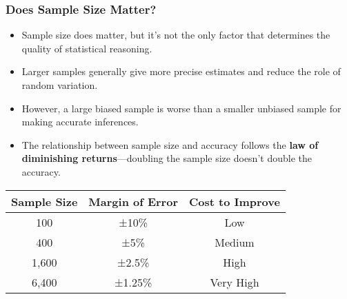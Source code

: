 \documentclass{beamer}
\begin{document}
	\begin{frame}
		\frametitle{Does Sample Size Matter?}
		
		\begin{itemize}
			\item Sample size does matter, but it's not the only factor that determines the quality of statistical reasoning.
			\item Larger samples generally give more precise estimates and reduce the role of random variation.
			\item However, a large biased sample is worse than a smaller unbiased sample for making accurate inferences.
			\item The relationship between sample size and accuracy follows the \textbf{law of diminishing returns}—doubling the sample size doesn't double the accuracy.
		\end{itemize}
		
		\begin{center}
			\begin{tabular}{|c|c|c|}
				\hline
				\textbf{Sample Size} & \textbf{Margin of Error} & \textbf{Cost to Improve} \\
				\hline
				100 & ±10\% & Low \\
				\hline
				400 & ±5\% & Medium \\
				\hline
				1,600 & ±2.5\% & High \\
				\hline
				6,400 & ±1.25\% & Very High \\
				\hline
			\end{tabular}
		\end{center}
		
	\end{frame}
	
\end{document}
